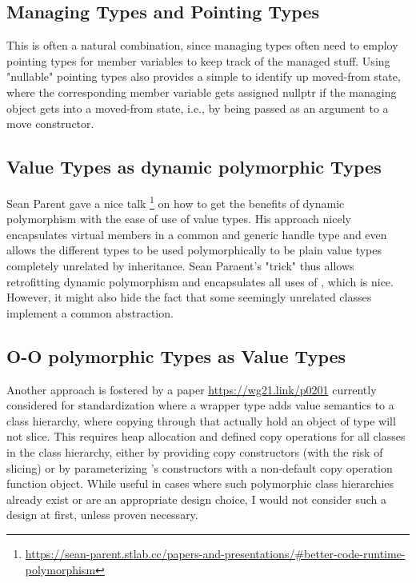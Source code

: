 \documentclass[ebook,11pt,article]{memoir}
\begin{document}
\subsection{Managing Types and Pointing Types}
This is often a natural combination, since managing types often need to employ pointing types for member variables to keep track of the managed stuff. Using "nullable" pointing types also provides a simple to identify up moved-from state, where the corresponding member variable gets assigned nullptr if the managing object gets into a moved-from state, i.e., by being passed as an argument to a move constructor.

\subsection{Value Types as dynamic polymorphic Types}
Sean Parent gave a nice talk \footnote{\url{https://sean-parent.stlab.cc/papers-and-presentations/\#better-code-runtime-polymorphism}} on how to get the benefits of dynamic polymorphism with the ease of use of value types. His approach nicely encapsulates virtual members in a common and generic handle type and even allows the different types to be used polymorphically to be plain value types completely unrelated by inheritance.
Sean Paraent's "trick" thus allows retrofitting dynamic polymorphism and encapsulates all uses of , which is nice. However, it might also hide the fact that some seemingly unrelated classes implement a common abstraction.

\subsection{O-O polymorphic Types as Value Types}
Another approach is fostered by a paper \url{https://wg21.link/p0201} currently considered for standardization where a  wrapper type adds value semantics to a class hierarchy, where copying through  that actually hold an object of type  will not slice. This requires heap allocation and defined copy operations for all classes in the class hierarchy, either by providing copy constructors (with the risk of slicing) or by parameterizing 's constructors with a non-default copy operation function object. While useful in cases where such polymorphic class hierarchies already exist or are an appropriate design choice, I would not consider such a design at first, unless proven necessary.
\end{document}
